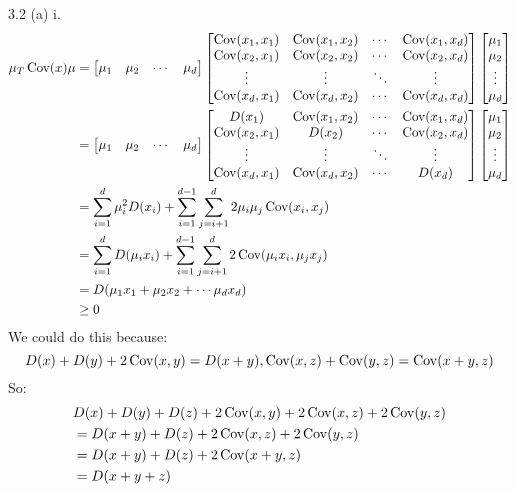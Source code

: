 \documentclass[a4paper]{article}
\begin{document}
$$$$
3.2 (a) i. $$
\begin{aligned}
\mu_T \operatorname{Cov}(x)\mu &= 
\begin{bmatrix}
\mu_1&\mu_2&\cdots&\mu_d 
\end{bmatrix}
\begin{bmatrix}
\operatorname{Cov}(x_1,x_1)&\operatorname{Cov}(x_1,x_2)&\cdots &\operatorname{Cov}(x_1,x_d)\\
\operatorname{Cov}(x_2,x_1)&\operatorname{Cov}(x_2,x_2)&\cdots &\operatorname{Cov}(x_2,x_d)\\
\vdots& \vdots & \ddots &\vdots\\
\operatorname{Cov}(x_d,x_1) &\operatorname{Cov}(x_d,x_2) &\cdots &\operatorname{Cov}(x_d,x_d)
\end{bmatrix}\begin{bmatrix}
\mu_1\\
\mu_2\\
\vdots\\
\mu_d 
\end{bmatrix}\\
&= \begin{bmatrix}
\mu_1&\mu_2&\cdots&\mu_d 
\end{bmatrix}\begin{bmatrix}
D(x_1)&\operatorname{Cov}(x_1,x_2)&\cdots &\operatorname{Cov}(x_1,x_d)\\
\operatorname{Cov}(x_2,x_1)&D(x_2)&\cdots &\operatorname{Cov}(x_2,x_d)\\
\vdots& \vdots & \ddots &\vdots\\
\operatorname{Cov}(x_d,x_1) &\operatorname{Cov}(x_d,x_2) &\cdots &D(x_d)
\end{bmatrix}\begin{bmatrix}
\mu_1\\
\mu_2\\
\vdots\\
\mu_d 
\end{bmatrix}\\
&= \sum_{i=1}^d \mu_i^2D(x_i)+\sum_{i=1}^{d-1}\sum_{j=i+1}^d 2\mu_i \mu_j \operatorname{Cov}(x_i,x_j)\\
&= \sum_{i=1}^d D(\mu_ix_i)+\sum_{i=1}^{d-1}\sum_{j=i+1}^d 2 \operatorname{Cov}(\mu_ix_i,\mu_j x_j)\\
&=  D(\mu_1x_1 + \mu_2x_2+ \cdots \mu_dx_d)\\
& \ge 0
\end{aligned}
$$
We could do this because:
$$
D(x) + D(y) +2\operatorname{Cov}(x,y) = D(x+y),\operatorname{Cov}(x,z)+\operatorname{Cov}(y,z) = \operatorname{Cov}(x+y,z)
$$
So:
$$
\begin{aligned}
&D(x)+D(y) +D(z) +2\operatorname{Cov}(x,y) +2 \operatorname{Cov}(x,z) + 2\operatorname{Cov}(y,z) \\
&= D(x+y) +D(z)+ 2\operatorname{Cov}(x,z) + 2\operatorname{Cov}(y,z)\\
&=D(x+y) +D(z) +2\operatorname{Cov}(x+y,z)\\
&=D(x+y+z)
\end{aligned}
$$
\end{document}
